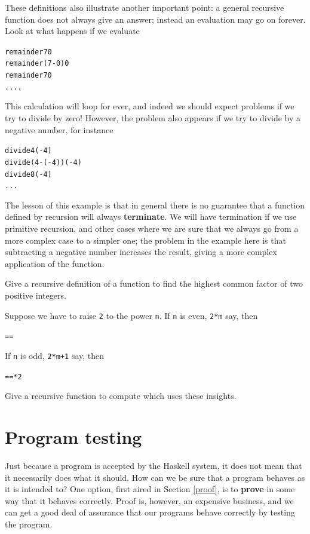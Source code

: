 These definitions also illustrate another important point: a general recursive function
does not always give an answer; instead an evaluation may go on forever. 
Look at what happens if we evaluate
\begin{alltt}
remainder 7 0
\step remainder (7-0) 0
\step remainder 7 0
\step ....
\end{alltt} 
This calculation will loop for ever, and indeed we should expect problems
if we try to divide by zero! However, the problem also appears if we try to divide by a
negative number, for instance
\begin{alltt}
divide 4 (-4)
\step divide (4-(-4)) (-4)
\step divide 8 (-4)
\step ...
\end{alltt}
The lesson of this example is that in general there is no guarantee that a function defined
by recursion will always \textbf{terminate}. 
We will have termination if we use primitive 
recursion, and other cases where we are sure that we always go from a more 
complex case to a simpler one; the problem in the example here is that
subtracting a negative number increases the result, giving a more complex application of the
function.


\begin{exercises}

\item
Give a recursive definition of a function to find the highest common
factor of two positive integers.

\item 
Suppose we have to raise \texttt{2} to the power \texttt{n}. If
\texttt{n} is even, \texttt{2*m} say, then
\begin{alltt}
 =  = 
\end{alltt}
If \texttt{n} is odd, \texttt{2*m+1} say, then
\begin{alltt}
 =  = *2
\end{alltt}
Give a recursive function to compute
 which uses these insights.
\end{exercises}


\section{Program testing}
\label{testing}

Just because a program is accepted by the Haskell system, it does not
mean that it necessarily does what it should.
How can we be sure that a program behaves as it is intended to? One
option, first aired in Section \ref{proof}, is to \textbf{prove} in some way that
it behaves correctly. Proof is, however, an expensive business,
and we can get a good deal of assurance that our programs behave
correctly by testing the program. 

